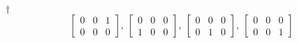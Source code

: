 \documentclass[a4paper,12pt]{article}
\begin{document}
\begin{enumerate}
\begin{answer}{$\dag$}
\begin{equation}
\begin{bmatrix}
                0 & 0 & 1 \\
                0 & 0 & 0
            \end{bmatrix}, \ \begin{bmatrix}
                0 & 0 & 0 \\
                1 & 0 & 0
            \end{bmatrix}, \ \begin{bmatrix}
                0 & 0 & 0 \\
                0 & 1 & 0
            \end{bmatrix}, \ \begin{bmatrix}
                0 & 0 & 0 \\
                0 & 0 & 1
            \end{bmatrix}
        \end{equation}
    \end{answer}
\end{enumerate}

\end{document}
